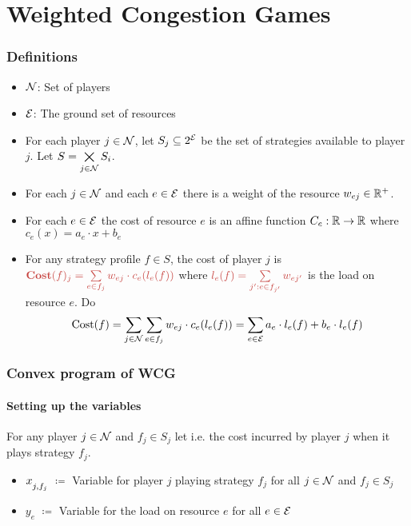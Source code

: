 \documentclass[aspectratio=1610,handout]{beamer}
\begin{document}
\section{Weighted Congestion Games}
\begin{frame}
	\frametitle{Definitions}
	\begin{itemize}
		\item $\mathcal{N}$: Set of players
		\item $\mathcal{E}$: The ground set of resources
		\item For each player $j \in \mathcal{N}$, let $S_j\subseteq 2^{\mathcal{E}}$ be the set of strategies available to player $j$. Let $S=\bigtimes\limits_{j\in\mathcal{N}}S_i$.
		\item For each $j\in \mathcal{N}$ and each $e\in \mathcal{E}$ there is a weight of the resource $w_{ej}\in\mathbb{R}^+$.
		\item For each $e\in \mathcal{E}$ the cost of resource $e$ is an affine function $C_e:\mathbb{R}\to\mathbb{R}$ where $c_e(x)=a_e\cdot x+b_e$
		\item For any strategy profile $f\in S$, the cost of player $j$ is $\mathcolor{myr}{\textbf{Cost}(f)_j=\sum\limits_{e\in f_j}w_{ej}\cdot c_e(l_e(f))}$ where $\mathcolor{myr}{l_e(f)=\sum\limits_{j':e\in f_{j'}}w_{ej'}}$ is the load on resource $e$. Do $$\text{Cost}(f)=\sum_{j\in\mathcal{N}}\sum_{e\in f_j}w_{ej}\cdot c_e(l_e(f))=\sum_{e\in\mathcal{E}}a_e\cdot l_e(f)+b_e\cdot l_e(f)$$
	\end{itemize}
\end{frame}
\begin{frame}
    \frametitle{Convex program of WCG}

	\framesubtitle{Setting up the variables}
	For any player $j\in\mathcal{N}$ and $f_j\in S_j$ let          \only<1>{
		\(
		\color{myr}{L\st_{j,f_j} = \sum\limits_{e \in f_j} w_{ej} \cdot c_e(w_{ej})}
		\)
	}
	i.e. the cost incurred by player $j$ when it plays strategy $f_j$.\pause

	\begin{itemize}[itemsep=2em, topsep=2em]
		\item $x\strut_{j,f_j}$  $\coloneqq$ Variable for player $j$ playing strategy $f_j$ for all $j\in\mathcal{N}$ and $f_j\in S_j$\pause

		\item $y_e$ $\coloneqq$ Variable for the load on resource $e$ for all $e\in\mathcal{E}$
	\end{itemize}
\end{frame}
\end{document}

